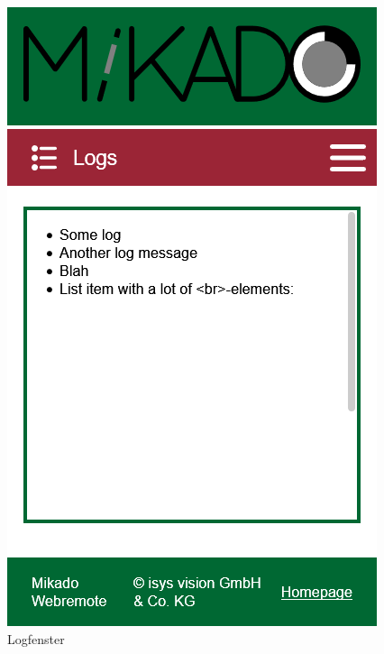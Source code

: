 \begin{figure}[H]
	\begin{center}
		\begin{minipage}{0.3\textwidth}
			\centering
			\includegraphics[width=\textwidth]{media/webremote-logs.png}
			\caption{Logfenster}
			\label{fig:webtools-remote-design-logfenster}
		\end{minipage}
		\begin{minipage}{0.3\textwidth}
			\centering

\end{minipage}
\end{center}
\end{figure}
